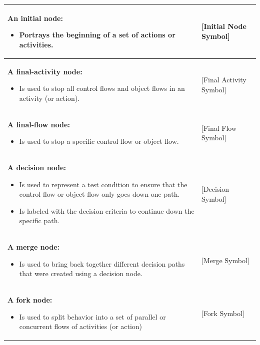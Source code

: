 \documentclass[12pt,a4paper]{report}
\begin{document}
\begin{longtable}{|p{8cm}|p{4cm}|}
\textbf{An initial node:} \newline
\begin{itemize}
    \item Portrays the beginning of a set of actions or activities.
\end{itemize} & [Initial Node Symbol] \\
\hline

\textbf{A final-activity node:} \newline
\begin{itemize}
    \item Is used to stop all control flows and object flows in an activity (or action).
\end{itemize} & [Final Activity Symbol] \\
\hline

\textbf{A final-flow node:} \newline
\begin{itemize}
    \item Is used to stop a specific control flow or object flow.
\end{itemize} & [Final Flow Symbol] \\
\hline

\textbf{A decision node:} \newline
\begin{itemize}
    \item Is used to represent a test condition to ensure that the control flow or object flow only goes down one path.
    \item Is labeled with the decision criteria to continue down the specific path.
\end{itemize} & [Decision Symbol] \\
\hline

\textbf{A merge node:} \newline
\begin{itemize}
    \item Is used to bring back together different decision paths that were created using a decision node.
\end{itemize} & [Merge Symbol] \\
\hline

\textbf{A fork node:} \newline
\begin{itemize}
    \item Is used to split behavior into a set of parallel or concurrent flows of activities (or action)
\end{itemize} & [Fork Symbol] \\
\hline


\end{longtable}
\end{document}
